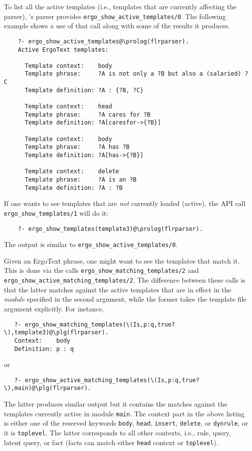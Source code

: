 To list all the active templates (i.e., templates that are
currently affecting the parser), \FLSYSTEM's parser provides
\texttt{ergo\_show\_active\_templates/0}. The following example
shows a use of that call along with some of the results it produces.
\begin{verbatim}
    ?- ergo_show_active_templates@\prolog(flrparser).
    Active ErgoText templates:

      Template context:    body
      Template phrase:     ?A is not only a ?B but also a (salaried) ?C
      Template definition: ?A : {?B, ?C}

      Template context:    head
      Template phrase:     ?A cares for ?B
      Template definition: ?A[caresfor->{?B}]

      Template context:    body
      Template phrase:     ?A has ?B
      Template definition: ?A[has->{?B}]

      Template context:    delete
      Template phrase:     ?A is an ?B
      Template definition: ?A : ?B
\end{verbatim}
If one wants to see templates that are \emph{not} currently loaded (active),
the API call \texttt{ergo\_show\_templates/1} will do it:
\begin{verbatim}
    ?- ergo_show_templates(template3)@\prolog(flrparser).
\end{verbatim}
The output is similar to \texttt{ergo\_show\_active\_templates/0}.

Given an ErgoText phrase, one might want to
see the templates that match it. This is done via
the calls \texttt{ergo\_show\_matching\_templates/2} and
\texttt{ergo\_show\_active\_matching\_templates/2}.
The difference between these calls is that the latter matches against the
active templates that are in effect in the \emph{module} specified in the second
argument, while the former
takes the template file argument explicitly. For instance,
\begin{verbatim}
   ?- ergo_show_matching_templates(\(Is,p:q,true?\),template3)@\plg(flrparser).
   Context:    body
   Definition: p : q
\end{verbatim}
or
\begin{verbatim}
   ?- ergo_show_active_matching_templates(\(Is,p:q,true?\),main)@\plg(flrparser).
\end{verbatim}
The latter produces similar output but it contains the matches against
the templates currently active in module \texttt{main}. The context part in the above listing is
either one of the reserved keywords \texttt{body},  \texttt{head},
\texttt{insert}, \texttt{delete}, or  \texttt{dynrule}, or it is
\texttt{toplevel}. The latter corresponds to all other contexts, i.e.,
rule, query, latent query, or fact (facts can match either \texttt{head}
context or \texttt{toplevel}).   

